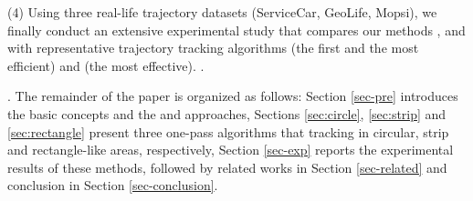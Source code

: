 \ni (4) Using three real-life trajectory datasets (ServiceCar, GeoLife, Mopsi), we finally conduct an extensive experimental study that compares our methods \citt, \sitt and \bitt with  representative trajectory tracking algorithms \ldrh (the first and the most efficient) and \grts (the most effective). \todo.

.
The remainder of the paper is organized as follows:
Section \ref{sec-pre} introduces the basic concepts and the \ldr and \ldrh approaches,
Sections \ref{sec:circle}, \ref{sec:strip} and \ref{sec:rectangle} present three one-pass algorithms that tracking in circular, strip and rectangle-like areas, respectively,
Section \ref{sec-exp} reports the experimental results of these methods, followed by related works in Section \ref{sec-related} and conclusion in Section \ref{sec-conclusion}.



